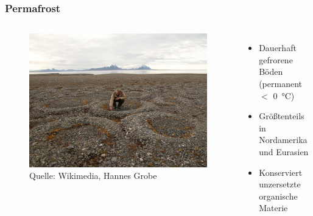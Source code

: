 \begin{frame}
	\frametitle{Permafrost}
  \begin{columns}
    \begin{figure}
      \centering
      \includegraphics[trim=0 0 0.66\imagewidth{} 0, clip, width = 0.8\linewidth]{bilder/Permafrost_stone-rings_hg.jpg}
      \caption{Quelle: Wikimedia, Hannes Grobe}
    \end{figure}
	\begin{itemize}
		\item Dauerhaft gefrorene Böden (permanent $<$ \SI{0}{\degreeCelsius})
		\item Größtenteils in Nordamerika und Eurasien
		\item Konserviert unzersetzte organische Materie

\end{itemize}
\end{columns}
\end{frame}

